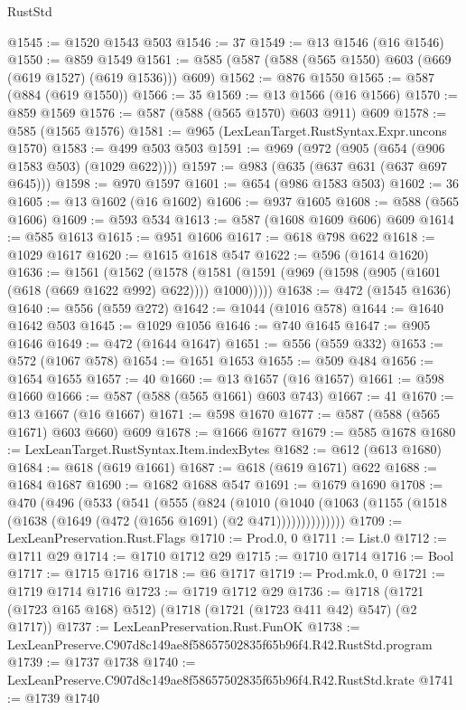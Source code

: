 \begin{lexlean}{RustStd}
\begin{coremodule}
@1545 := @1520 @1543 @503
@1546 := 37
@1549 := @13 @1546 (@16 @1546)
@1550 := @859 @1549
@1561 := @585 (@587 (@588 (@565 @1550) @603 (@669 (@619 @1527) (@619 @1536))) @609)
@1562 := @876 @1550
@1565 := @587 (@884 (@619 @1550))
@1566 := 35
@1569 := @13 @1566 (@16 @1566)
@1570 := @859 @1569
@1576 := @587 (@588 (@565 @1570) @603 @911) @609
@1578 := @585 (@1565 @1576)
@1581 := @965 (LexLeanTarget.RustSyntax.Expr.uncons @1570)
@1583 := @499 @503 @503
@1591 := @969 (@972 (@905 (@654 (@906 @1583 @503) (@1029 @622))))
@1597 := @983 (@635 (@637 @631 (@637 @697 @645)))
@1598 := @970 @1597
@1601 := @654 (@986 @1583 @503)
@1602 := 36
@1605 := @13 @1602 (@16 @1602)
@1606 := @937 @1605
@1608 := @588 (@565 @1606)
@1609 := @593 @534
@1613 := @587 (@1608 @1609 @606) @609
@1614 := @585 @1613
@1615 := @951 @1606
@1617 := @618 @798 @622
@1618 := @1029 @1617
@1620 := @1615 @1618 @547
@1622 := @596 (@1614 @1620)
@1636 := @1561
    (@1562
      (@1578 (@1581 (@1591 (@969 (@1598 (@905 (@1601 (@618 (@669 @1622 @992) @622)))) @1000)))))
@1638 := @472 (@1545 @1636)
@1640 := @556 (@559 @272)
@1642 := @1044 (@1016 @578)
@1644 := @1640 @1642 @503
@1645 := @1029 @1056
@1646 := @740 @1645
@1647 := @905 @1646
@1649 := @472 (@1644 @1647)
@1651 := @556 (@559 @332)
@1653 := @572 (@1067 @578)
@1654 := @1651 @1653
@1655 := @509 @484
@1656 := @1654 @1655
@1657 := 40
@1660 := @13 @1657 (@16 @1657)
@1661 := @598 @1660
@1666 := @587 (@588 (@565 @1661) @603 @743)
@1667 := 41
@1670 := @13 @1667 (@16 @1667)
@1671 := @598 @1670
@1677 := @587 (@588 (@565 @1671) @603 @660) @609
@1678 := @1666 @1677
@1679 := @585 @1678
@1680 := LexLeanTarget.RustSyntax.Item.indexBytes
@1682 := @612 (@613 @1680)
@1684 := @618 (@619 @1661)
@1687 := @618 (@619 @1671) @622
@1688 := @1684 @1687
@1690 := @1682 @1688 @547
@1691 := @1679 @1690
@1708 := @470
    (@496
      (@533
        (@541
          (@555
            (@824
              (@1010
                (@1040 (@1063 (@1155 (@1518 (@1638 (@1649 (@472 (@1656 @1691) (@2 @471))))))))))))))
@1709 := LexLeanPreservation.Rust.Flags
@1710 := Prod.{0, 0}
@1711 := List.{0}
@1712 := @1711 @29
@1714 := @1710 @1712 @29
@1715 := @1710 @1714
@1716 := Bool
@1717 := @1715 @1716
@1718 := @6 @1717
@1719 := Prod.mk.{0, 0}
@1721 := @1719 @1714 @1716
@1723 := @1719 @1712 @29
@1736 := @1718 (@1721 (@1723 @165 @168) @512) (@1718 (@1721 (@1723 @411 @42) @547) (@2 @1717))
@1737 := LexLeanPreservation.Rust.FunOK
@1738 := LexLeanPreserve.C907d8c149ae8f58657502835f65b96f4.R42.RustStd.program
@1739 := @1737 @1738
@1740 := LexLeanPreserve.C907d8c149ae8f58657502835f65b96f4.R42.RustStd.krate
@1741 := @1739 @1740

\end{coremodule}
\end{lexlean}
